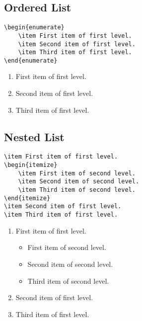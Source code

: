 \subsection*{Ordered List}

\begin{lstlisting}[caption={An ordered list.}]
\begin{enumerate}
    \item First item of first level.
    \item Second item of first level.
    \item Third item of first level.
\end{enumerate}
\end{lstlisting}

\begin{enumerate}
    \item First item of first level.
    \item Second item of first level.
    \item Third item of first level.
\end{enumerate}

\subsection*{Nested List}

\begin{lstlisting}[caption={A nested list.}]
\item First item of first level.
\begin{itemize}
    \item First item of second level.
    \item Second item of second level.
    \item Third item of second level.
\end{itemize}
\item Second item of first level.
\item Third item of first level.
\end{lstlisting}

\begin{enumerate}
    \item First item of first level.
    \begin{itemize}
        \item First item of second level.
        \item Second item of second level.
        \item Third item of second level.
    \end{itemize}
    \item Second item of first level.
    \item Third item of first level.
\end{enumerate}

